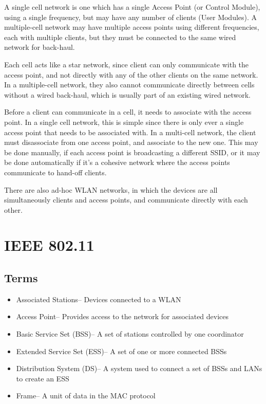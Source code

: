 
A single cell network is one which has a single Access Point (or Control Module), using a single frequency, but may have
 any number of clients (User Modules). A multiple-cell network may have multiple access points using different
 frequencies, each with multiple clients, but they must be connected to the same wired network for back-haul.

Each cell acts like a star network, since client can only communicate with the access point, and not directly with any
 of the other clients on the same network. In a multiple-cell network, they also cannot communicate directly between
 cells without a wired back-haul, which is usually part of an existing wired network.

Before a client can communicate in a cell, it needs to associate with the access point. In a single cell network, this
 is simple since there is only ever a single access point that needs to be associated with. In a multi-cell network,
 the client must disassociate from one access point, and associate to the new one. This may be done manually, if each
 access point is broadcasting a different SSID, or it may be done automatically if it's a cohesive network where the
 access points communicate to hand-off clients.

There are also ad-hoc WLAN networks, in which the devices are all simultaneously clients and access points, and
 communicate directly with each other.

\section*{IEEE 802.11}

\subsection*{Terms}

\begin{itemize}
  \item Associated Stations-- Devices connected to a WLAN
  \item Access Point-- Provides access to the network for associated devices
  \item Basic Service Set (BSS)-- A set of stations controlled by one coordinator
  \item Extended Service Set (ESS)-- A set of one or more connected BSSs
  \item Distribution System (DS)-- A system used to connect a set of BSSs and LANs to create an ESS
  \item Frame-- A unit of data in the MAC protocol
\end{itemize}

